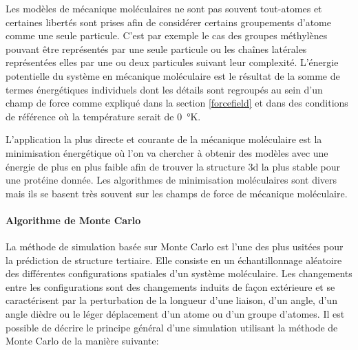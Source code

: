 Les modèles de mécanique moléculaires ne sont pas souvent tout-atomes et certaines libertés sont prises afin de considérer certains groupements d'atome comme une seule particule. C'est par exemple le cas des groupes méthylènes pouvant être représentés par une seule particule ou les chaînes latérales représentées elles par une ou deux particules suivant leur complexité. L'énergie potentielle du système en mécanique moléculaire est le résultat de la somme de termes énergétiques individuels dont les détails sont regroupés au sein d'un champ de force comme expliqué dans la section \ref{forcefield} et dans des conditions de référence où la température serait de \SI{0}{\degree}K.

L'application la plus directe et courante de la mécanique moléculaire est la minimisation énergétique où l'on va chercher à obtenir des modèles avec une énergie de plus en plus faible afin de trouver la structure 3d la plus stable pour une protéine donnée. Les algorithmes de minimisation moléculaires sont divers mais ils se basent très souvent sur les champs de force de mécanique moléculaire.


\paragraph{Algorithme de Monte Carlo}

La méthode de simulation basée sur Monte Carlo est l'une des plus usitées \cite{metropolis1949monte} pour la prédiction de structure tertiaire. Elle consiste en un échantillonnage aléatoire des différentes configurations spatiales d'un système moléculaire. Les changements entre les configurations sont des changements induits de façon extérieure et se caractérisent par la perturbation de la longueur d'une liaison, d'un angle, d'un angle dièdre ou le léger déplacement d'un atome ou d'un groupe d'atomes. Il est possible de décrire le principe général d'une simulation utilisant la méthode de Monte Carlo de la manière suivante:

